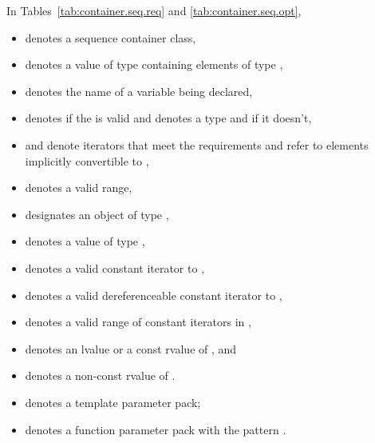 \documentclass{wg21}
\begin{document}
In Tables~\ref{tab:container.seq.req}
and \ref{tab:container.seq.opt},
\begin{itemize}
    \item
     denotes a sequence container class,
    \item
     denotes a value of type  containing elements of type ,
    \item
     denotes the name of a variable being declared,
    \item
     denotes  if
    the   is valid and denotes a
    type and
     if it doesn't,
    \item
     and 
    denote iterators that meet the  requirements
    and refer to elements implicitly convertible to ,
    \item
    \tcode{[i, j)} denotes a valid range,
    \item
     designates an object of type ,
    \item
     denotes a value of type ,
    \item
     denotes a valid constant iterator to ,
    \item
     denotes a valid dereferenceable constant iterator to ,
    \item
    \tcode{[q1, q2)} denotes a valid range of constant iterators in ,
    \item
     denotes an lvalue or a const rvalue of , and
    \item
     denotes a non-const rvalue of .
    \item
     denotes a template parameter pack;
    \item
     denotes a function parameter pack with the pattern .
\end{itemize}
\end{document}
